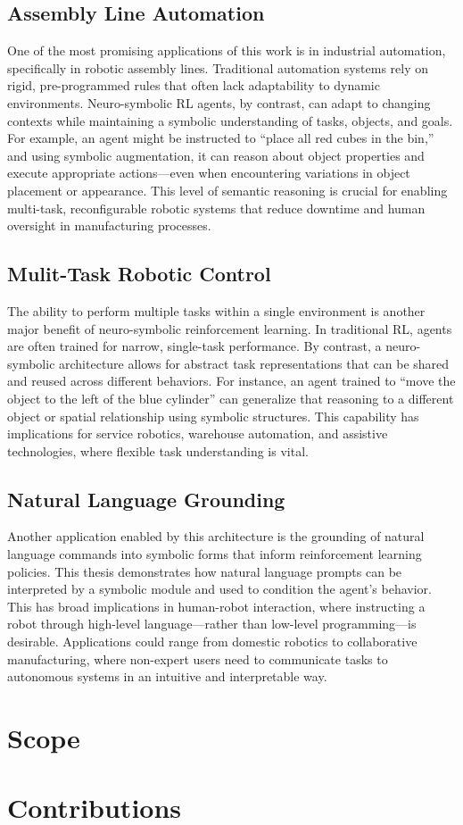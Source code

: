 \subsection{Assembly Line Automation}
One of the most promising applications of this work is in industrial automation, specifically in robotic assembly lines. Traditional automation systems rely on rigid, pre-programmed rules that often lack adaptability to dynamic environments. Neuro-symbolic RL agents, by contrast, can adapt to changing contexts while maintaining a symbolic understanding of tasks, objects, and goals. For example, an agent might be instructed to “place all red cubes in the bin,” and using symbolic augmentation, it can reason about object properties and execute appropriate actions—even when encountering variations in object placement or appearance. This level of semantic reasoning is crucial for enabling multi-task, reconfigurable robotic systems that reduce downtime and human oversight in manufacturing processes.

\subsection{Mulit-Task Robotic Control}
The ability to perform multiple tasks within a single environment is another major benefit of neuro-symbolic reinforcement learning. In traditional RL, agents are often trained for narrow, single-task performance. By contrast, a neuro-symbolic architecture allows for abstract task representations that can be shared and reused across different behaviors. For instance, an agent trained to “move the object to the left of the blue cylinder” can generalize that reasoning to a different object or spatial relationship using symbolic structures. This capability has implications for service robotics, warehouse automation, and assistive technologies, where flexible task understanding is vital.

\subsection{Natural Language Grounding}
Another application enabled by this architecture is the grounding of natural language commands into symbolic forms that inform reinforcement learning policies. This thesis demonstrates how natural language prompts can be interpreted by a symbolic module and used to condition the agent’s behavior. This has broad implications in human-robot interaction, where instructing a robot through high-level language—rather than low-level programming—is desirable. Applications could range from domestic robotics to collaborative manufacturing, where non-expert users need to communicate tasks to autonomous systems in an intuitive and interpretable way.

\section{Scope}
\section{Contributions}
